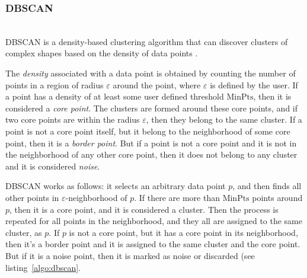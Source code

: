 \subsubsection{DBSCAN} \label{sec:dbscan} \ \\

DBSCAN is a density-based clustering algorithm that can discover
clusters of complex shapes based on the density of data points \cite{ester1996density}.

The \emph{density} associated with a data point is obtained by
counting the number of points in a region of radius $\varepsilon$
around the point, where $\varepsilon$  is defined by the user.
If a point has a density of at least some user defined
threshold $\text{MinPts}$, then it is considered a \emph{core point}.
The clusters are formed around these core points, and if two core points
are within the radius $\varepsilon$, then they belong to the same cluster.
If a point is not a core point itself, but it belong to the neighborhood of some
core point, then it is a \emph{border point}. But if a point is not a core point
and it is not in the neighborhood of any other core point, then it does not
belong to any cluster and it is considered \emph{noise}.

DBSCAN works as follows: it selects an arbitrary data point $p$, and then
finds all other points in $\varepsilon$-neighborhood of $p$. If
there are more than $\text{MinPts}$ points around $p$, then it is a core point,
and it is considered a cluster. Then the process is repeated for all points in
the neighborhood, and they all are assigned to the same cluster, as $p$.
If $p$ is not a core point, but it has a core point in its neighborhood, then
it's a border point and it is assigned to the same cluster and the core point.
But if it is a noise point, then it is marked as noise or discarded 
(see listing~\ref{algo:dbscan}.


